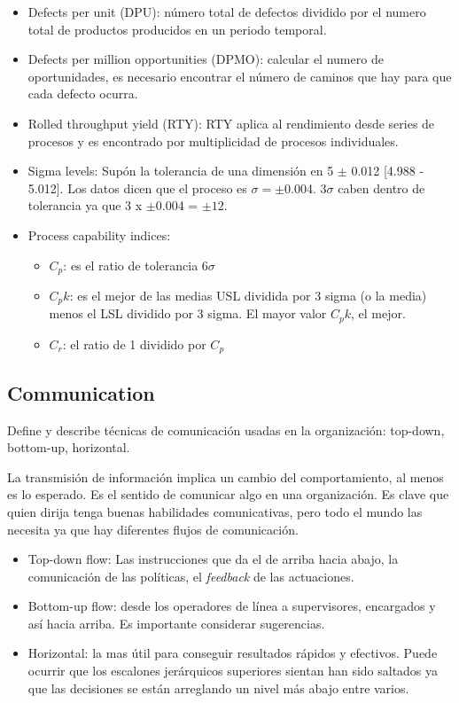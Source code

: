 \documentclass[]{article}
\begin{document}
\begin{itemize}
	\item Defects per unit (DPU): número total de defectos dividido por el numero total de productos producidos en un periodo temporal.
	\item Defects per million opportunities (DPMO): calcular el numero de oportunidades, es necesario encontrar el número de caminos que hay para que cada defecto ocurra.
	\item Rolled throughput yield (RTY): RTY aplica al rendimiento desde series de procesos y es encontrado por multiplicidad de procesos individuales.
	\item Sigma levels: Supón la tolerancia de una dimensión en 5 $\pm$ 0.012 [4.988 - 5.012]. Los datos dicen que el proceso es $\sigma = \pm$0.004. 3$\sigma$ caben dentro de tolerancia ya que 3 x $\pm$0.004 = $\pm 12$.
	\item Process capability indices:
	\begin{itemize}
		\item $C_p$: es el ratio de tolerancia $6\sigma$ 
		\item $C_pk$: es el mejor de las medias USL dividida por 3 sigma (o la media) menos el LSL dividido por 3 sigma. El mayor valor $C_pk$, el mejor.
		\item $C_r$: el ratio de 1 dividido por $C_p$
	\end{itemize}
\end{itemize}

\subsection{Communication}

Define y describe técnicas de comunicación usadas en la organización: top-down, bottom-up, horizontal.

La transmisión de información implica un cambio del comportamiento, al menos es lo esperado. Es el sentido de comunicar algo en una organización. Es clave que quien dirija tenga buenas habilidades comunicativas, pero todo el mundo las necesita ya que hay diferentes flujos de comunicación.

\begin{itemize}
	\item Top-down flow: Las instrucciones que da el de arriba hacia abajo, la comunicación de las políticas, el \textit{feedback} de las actuaciones.
	\item Bottom-up flow: desde los operadores de línea a supervisores, encargados y así hacia arriba. Es importante considerar sugerencias.
	\item Horizontal: la mas útil para conseguir resultados rápidos y efectivos. Puede ocurrir que los escalones jerárquicos superiores sientan han sido saltados ya que las decisiones se están arreglando un nivel más abajo entre varios.
\end{itemize}
\end{document}
